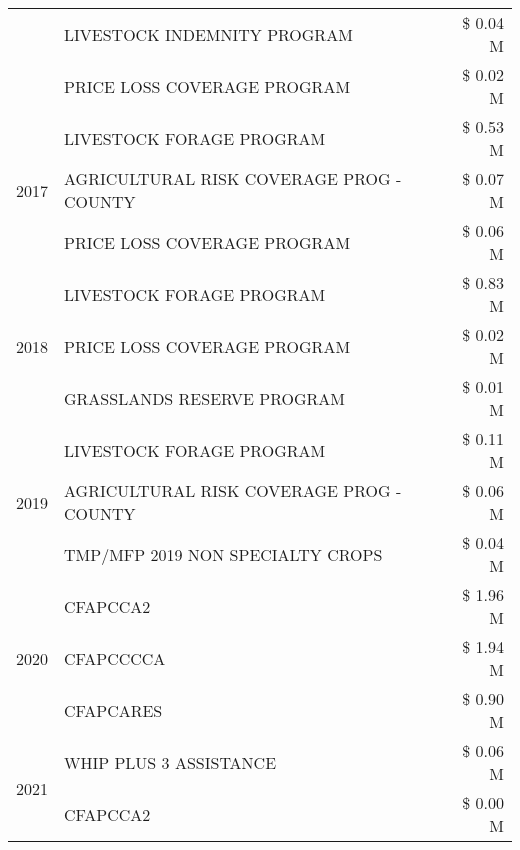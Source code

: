 \begin{tabular}{llr}
 & LIVESTOCK INDEMNITY PROGRAM & \$ 0.04 M \\
 & PRICE LOSS COVERAGE PROGRAM & \$ 0.02 M \\
\cline{1-3}
\multirow[t]{3}{*}{2017} & LIVESTOCK FORAGE PROGRAM & \$ 0.53 M \\
 & AGRICULTURAL RISK COVERAGE PROG - COUNTY & \$ 0.07 M \\
 & PRICE LOSS COVERAGE PROGRAM & \$ 0.06 M \\
\cline{1-3}
\multirow[t]{3}{*}{2018} & LIVESTOCK FORAGE PROGRAM & \$ 0.83 M \\
 & PRICE LOSS COVERAGE PROGRAM & \$ 0.02 M \\
 & GRASSLANDS RESERVE PROGRAM & \$ 0.01 M \\
\cline{1-3}
\multirow[t]{3}{*}{2019} & LIVESTOCK FORAGE PROGRAM & \$ 0.11 M \\
 & AGRICULTURAL RISK COVERAGE PROG - COUNTY & \$ 0.06 M \\
 & TMP/MFP 2019 NON SPECIALTY CROPS & \$ 0.04 M \\
\cline{1-3}
\multirow[t]{3}{*}{2020} & CFAPCCA2 & \$ 1.96 M \\
 & CFAPCCCCA & \$ 1.94 M \\
 & CFAPCARES & \$ 0.90 M \\
\cline{1-3}
\multirow[t]{2}{*}{2021} & WHIP PLUS 3 ASSISTANCE & \$ 0.06 M \\
 & CFAPCCA2 & \$ 0.00 M \\
\cline{1-3}
\bottomrule
\end{tabular}
